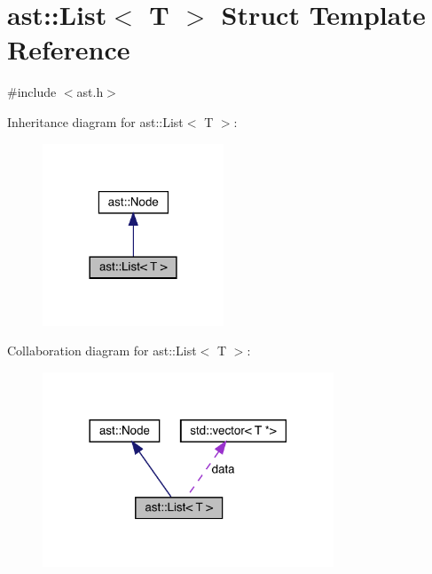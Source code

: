 \hypertarget{structast_1_1_list}{}\section{ast\+:\+:List$<$ T $>$ Struct Template Reference}
\label{structast_1_1_list}


{\ttfamily \#include $<$ast.\+h$>$}



Inheritance diagram for ast\+:\+:List$<$ T $>$\+:
\nopagebreak
\begin{figure}[H]
\begin{center}
\leavevmode
\includegraphics[width=153pt]{structast_1_1_list__inherit__graph}
\end{center}
\end{figure}


Collaboration diagram for ast\+:\+:List$<$ T $>$\+:
\nopagebreak
\begin{figure}[H]
\begin{center}
\leavevmode
\includegraphics[width=246pt]{structast_1_1_list__coll__graph}
\end{center}
\end{figure}
